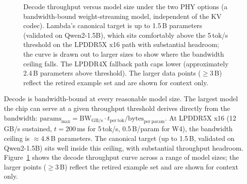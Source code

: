 \documentclass[conference]{IEEEtran}
\begin{document}
\begin{figure}[t]
\centering
{}
\caption{Decode throughput versus model size under the two PHY options (a bandwidth-bound weight-streaming model, independent of the KV codec). Lambda's canonical target is up to 1.5\,B parameters (validated on Qwen2-1.5B), which sits comfortably above the 5\,tok/s threshold on the LPDDR5X x16 path with substantial headroom; the curve is drawn out to larger sizes to show where the bandwidth ceiling falls. The LPDDR4X fallback path caps lower (approximately 2.4\,B parameters above threshold). The larger data points ($\geq$3\,B) reflect the retired example set and are shown for context only.}
\label{fig:perf}
\end{figure}

Decode is bandwidth-bound at every reasonable model size. The largest model the chip can serve at a given throughput threshold derives directly from the bandwidth: $\mathrm{params}_{\max} = \mathrm{BW}_{\mathrm{GB/s}} \cdot t_{\mathrm{per\ tok}} / \mathrm{bytes}_{\mathrm{per\ param}}$. At LPDDR5X x16 (12\,GB/s sustained, $t=200$\,ms for 5\,tok/s, 0.5\,B/param for W4), the bandwidth ceiling is $\approx$4.8\,B parameters. The canonical target (up to 1.5\,B, validated on Qwen2-1.5B) sits well inside this ceiling, with substantial throughput headroom. Figure~\ref{fig:perf} shows the decode throughput curve across a range of model sizes; the larger points ($\geq$3\,B) reflect the retired example set and are shown for context only.
\end{document}
